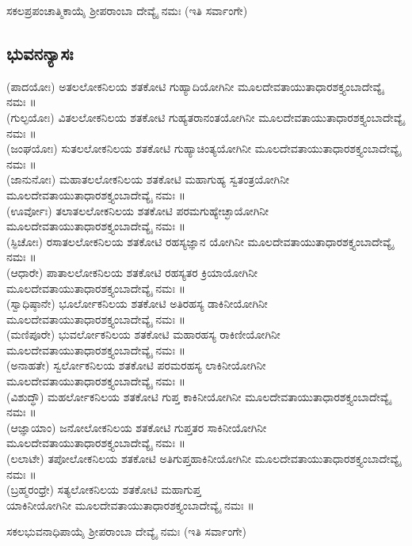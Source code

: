   ಸಕಲಪ್ರಪಂಚಾತ್ಮಿಕಾಯೈ  ಶ್ರೀಪರಾಂಬಾ ದೇವ್ಯೈ ನಮಃ (ಇತಿ ಸರ್ವಾಂಗೇ)
\subsection{ಭುವನನ್ಯಾಸಃ} 
(ಪಾದಯೋಃ)  ಅತಲಲೋಕನಿಲಯ ಶತಕೋಟಿ ಗುಹ್ಯಾದಿಯೋಗಿನೀ ಮೂಲದೇವತಾಯುತಾಧಾರಶಕ್ತ್ಯಂಬಾದೇವ್ಯೈ ನಮಃ ॥\\
(ಗುಲ್ಫಯೋಃ)  ವಿತಲಲೋಕನಿಲಯ ಶತಕೋಟಿ ಗುಹ್ಯತರಾನಂತಯೋಗಿನೀ ಮೂಲದೇವತಾಯುತಾಧಾರಶಕ್ತ್ಯಂಬಾದೇವ್ಯೈ ನಮಃ ॥\\
(ಜಂಘಯೋಃ)  ಸುತಲಲೋಕನಿಲಯ ಶತಕೋಟಿ ಗುಹ್ಯಾಚಿಂತ್ಯಯೋಗಿನೀ ಮೂಲದೇವತಾಯುತಾಧಾರಶಕ್ತ್ಯಂಬಾದೇವ್ಯೈ ನಮಃ ॥\\
(ಜಾನುನೋಃ)  ಮಹಾತಲಲೋಕನಿಲಯ ಶತಕೋಟಿ ಮಹಾಗುಹ್ಯ ಸ್ವತಂತ್ರಯೋಗಿನೀ ಮೂಲದೇವತಾಯುತಾಧಾರಶಕ್ತ್ಯಂಬಾದೇವ್ಯೈ ನಮಃ ॥\\
(ಊರ್ವೋಃ)  ತಲಾತಲಲೋಕನಿಲಯ ಶತಕೋಟಿ ಪರಮಗುಹ್ಯೇಚ್ಛಾಯೋಗಿನೀ ಮೂಲದೇವತಾಯುತಾಧಾರಶಕ್ತ್ಯಂಬಾದೇವ್ಯೈ ನಮಃ ॥\\
(ಸ್ಫಿಚೋಃ) ರಸಾತಲಲೋಕನಿಲಯ ಶತಕೋಟಿ ರಹಸ್ಯಜ್ಞಾನ ಯೋಗಿನೀ ಮೂಲದೇವತಾಯುತಾಧಾರಶಕ್ತ್ಯಂಬಾದೇವ್ಯೈ ನಮಃ ॥\\
(ಆಧಾರೇ)  ಪಾತಾಲಲೋಕನಿಲಯ ಶತಕೋಟಿ ರಹಸ್ಯತರ ಕ್ರಿಯಾಯೋಗಿನೀ ಮೂಲದೇವತಾಯುತಾಧಾರಶಕ್ತ್ಯಂಬಾದೇವ್ಯೈ ನಮಃ ॥\\
(ಸ್ವಾಧಿಷ್ಠಾನೇ)  ಭೂರ್ಲೋಕನಿಲಯ ಶತಕೋಟಿ ಅತಿರಹಸ್ಯ ಡಾಕಿನೀಯೋಗಿನೀ ಮೂಲದೇವತಾಯುತಾಧಾರಶಕ್ತ್ಯಂಬಾದೇವ್ಯೈ ನಮಃ ॥\\
(ಮಣಿಪೂರೇ)  ಭುವರ್ಲೋಕನಿಲಯ ಶತಕೋಟಿ ಮಹಾರಹಸ್ಯ ರಾಕಿಣೀಯೋಗಿನೀ ಮೂಲದೇವತಾಯುತಾಧಾರಶಕ್ತ್ಯಂಬಾದೇವ್ಯೈ ನಮಃ ॥\\
(ಅನಾಹತೇ)  ಸ್ವರ್ಲೋಕನಿಲಯ ಶತಕೋಟಿ ಪರಮರಹಸ್ಯ ಲಾಕಿನೀಯೋಗಿನೀ ಮೂಲದೇವತಾಯುತಾಧಾರಶಕ್ತ್ಯಂಬಾದೇವ್ಯೈ ನಮಃ ॥\\
(ವಿಶುದ್ಧೌ)  ಮಹರ್ಲೋಕನಿಲಯ ಶತಕೋಟಿ ಗುಪ್ತ ಕಾಕಿನೀಯೋಗಿನೀ ಮೂಲದೇವತಾಯುತಾಧಾರಶಕ್ತ್ಯಂಬಾದೇವ್ಯೈ ನಮಃ ॥\\
(ಆಜ್ಞಾಯಾಂ)  ಜನೋಲೋಕನಿಲಯ ಶತಕೋಟಿ ಗುಪ್ತತರ ಸಾಕಿನೀಯೋಗಿನೀ ಮೂಲದೇವತಾಯುತಾಧಾರಶಕ್ತ್ಯಂಬಾದೇವ್ಯೈ ನಮಃ ॥\\
(ಲಲಾಟೇ)  ತಪೋಲೋಕನಿಲಯ ಶತಕೋಟಿ ಅತಿಗುಪ್ತಹಾಕಿನೀಯೋಗಿನೀ ಮೂಲದೇವತಾಯುತಾಧಾರಶಕ್ತ್ಯಂಬಾದೇವ್ಯೈ ನಮಃ ॥\\
(ಬ್ರಹ್ಮರಂಧ್ರೇ)  ಸತ್ಯಲೋಕನಿಲಯ ಶತಕೋಟಿ ಮಹಾಗುಪ್ತ\\ ಯಾಕಿನೀಯೋಗಿನೀ ಮೂಲದೇವತಾಯುತಾಧಾರಶಕ್ತ್ಯಂಬಾದೇವ್ಯೈ ನಮಃ ॥

  ಸಕಲಭುವನಾಧಿಪಾಯೈ  ಶ್ರೀಪರಾಂಬಾ ದೇವ್ಯೈ ನಮಃ  (ಇತಿ ಸರ್ವಾಂಗೇ)

